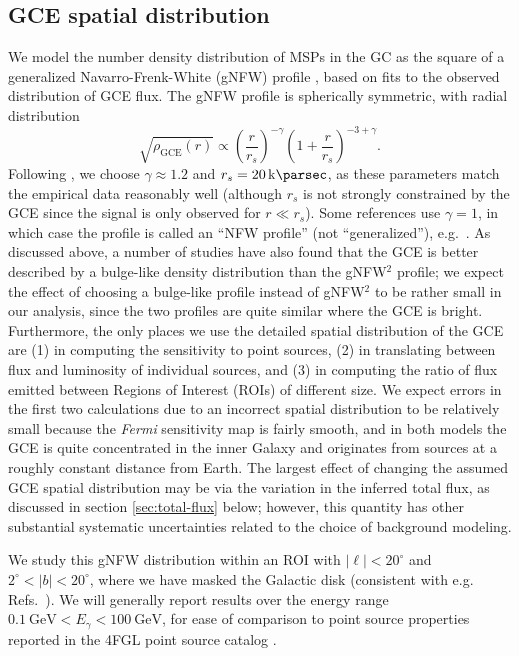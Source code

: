 \documentclass[letter,11pt]{article}
\newcommand{\parens}[1]{\left(#1\right)}
\begin{document}
\subsection{GCE spatial distribution}
We model the number density distribution of MSPs in the GC as the square of a generalized Navarro-Frenk-White (gNFW) profile \cite{Navarro:1995iw}, based on fits to the observed distribution of GCE flux. The gNFW profile is spherically symmetric, with radial distribution
\label{sec:spatial-distro}
\begin{equation}
    \sqrt{\rho_\text{GCE}(r)} \propto \parens{\frac{r}{r_s}}^{-\gamma}\parens{1 + \frac{r}{r_s}}^{-3+\gamma}.
    \label{eqn:nfw}
\end{equation}
Following \cite{Calore:2014xka, Gordon13, DiMauro:2021raz}, we choose $\gamma \approx 1.2$ and $r_s = \SI{20}{\kilo\parsec}$, as these parameters match the empirical data reasonably well (although $r_s$ is not strongly constrained by the GCE since the signal is only observed for $r \ll r_s$). Some references use $\gamma=1$, in which case the profile is called an ``NFW profile'' (not ``generalized''), e.g.~\cite{Zhong:2019ycb}. As discussed above, a number of studies have also found that the GCE is better described by a bulge-like density distribution than the gNFW$^2$ profile; we expect the effect of choosing a bulge-like profile instead of gNFW$^2$ to be rather small in our analysis, since the two profiles are quite similar where the GCE is bright. Furthermore, the only places we use the detailed spatial distribution of the GCE are (1) in computing the sensitivity to point sources, (2) in translating between flux and luminosity of individual sources, and (3) in computing the ratio of flux emitted between Regions of Interest (ROIs) of different size. We expect errors in the first two calculations due to an incorrect spatial distribution to be relatively small because the {\it Fermi} sensitivity map is fairly smooth, and in both models the GCE is quite concentrated in the inner Galaxy and originates from sources at a roughly constant distance from Earth. The largest effect of changing the assumed GCE spatial distribution may be via the variation in the inferred total flux, as discussed in section \ref{sec:total-flux} below; however, this quantity has other substantial systematic uncertainties related to the choice of background modeling.

We study this gNFW distribution within an ROI with $|\ell| < 20^\circ$ and $2^\circ < |b| < 20^\circ$, where we have masked the Galactic disk (consistent with e.g. Refs.~\cite{Zhong:2019ycb, Calore:2014nla}). We will generally report results over the energy range $\SI{0.1}{\giga\electronvolt} < E_\gamma < \SI{100}{\giga\electronvolt}$, for ease of comparison to point source properties reported in the 4FGL point source catalog \cite{Fermi-LAT:2019yla}.
\end{document}
